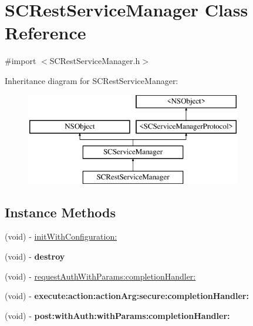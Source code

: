 \hypertarget{interface_s_c_rest_service_manager}{}\section{S\+C\+Rest\+Service\+Manager Class Reference}
\label{interface_s_c_rest_service_manager}


{\ttfamily \#import $<$S\+C\+Rest\+Service\+Manager.\+h$>$}

Inheritance diagram for S\+C\+Rest\+Service\+Manager\+:\begin{figure}[H]
\begin{center}
\leavevmode
\includegraphics[height=4.000000cm]{interface_s_c_rest_service_manager}
\end{center}
\end{figure}
\subsection*{Instance Methods}
\begin{DoxyCompactItemize}
\item 
(void) -\/ \hyperlink{interface_s_c_rest_service_manager_a8c41f25467e8b4744275928b04e6032e}{init\+With\+Configuration\+:}
\item 
(void) -\/ {\bfseries destroy}\hypertarget{interface_s_c_rest_service_manager_ac004e3ade0da8a94e0e0367090a71c49}{}\label{interface_s_c_rest_service_manager_ac004e3ade0da8a94e0e0367090a71c49}

\item 
(void) -\/ \hyperlink{interface_s_c_rest_service_manager_a8aebf99e17b53f9e7ad90dd7d8a90ccd}{request\+Auth\+With\+Params\+:completion\+Handler\+:}
\item 
(void) -\/ {\bfseries execute\+:action\+:action\+Arg\+:secure\+:completion\+Handler\+:}\hypertarget{interface_s_c_rest_service_manager_a87a8e99c816564af2455fce01dc653ce}{}\label{interface_s_c_rest_service_manager_a87a8e99c816564af2455fce01dc653ce}

\item 
(void) -\/ {\bfseries post\+:with\+Auth\+:with\+Params\+:completion\+Handler\+:}\hypertarget{interface_s_c_rest_service_manager_a41874f1271d4ba07315ded13de8da148}{}\label{interface_s_c_rest_service_manager_a41874f1271d4ba07315ded13de8da148}

\end{DoxyCompactItemize}
